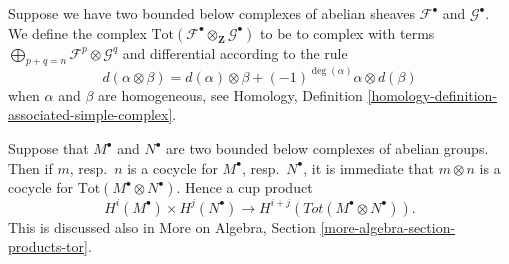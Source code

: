 \medskip\noindent
Suppose we have two bounded below complexes of abelian sheaves
${\mathcal F}^\bullet$ and ${\mathcal G}^\bullet$. We define the complex
$\text{Tot}({\mathcal F}^\bullet\otimes_{\mathbf Z} {\mathcal G}^\bullet)$
to be to complex with terms
$\bigoplus_{p + q = n} {\mathcal F}^p \otimes {\mathcal G}^q$
and differential according to the rule
\begin{equation}
\label{equation-differential-tensor-product-complexes}
d(\alpha \otimes \beta) =
d(\alpha)\otimes \beta + (-1)^{\deg(\alpha)} \alpha \otimes d(\beta)
\end{equation}
when $\alpha$ and $\beta$ are homogeneous, see
Homology, Definition \ref{homology-definition-associated-simple-complex}.

\medskip\noindent
Suppose that $M^\bullet$ and $N^\bullet$ are two bounded below
complexes of abelian groups. Then if $m$, resp.\ $n$
is a cocycle for $M^\bullet$, resp.\ $N^\bullet$, it is immediate
that $m \otimes n$ is a cocycle for $\text{Tot}(M^\bullet\otimes N^\bullet)$.
Hence a cup product
$$
H^i(M^\bullet) \times H^j(N^\bullet)
\longrightarrow
H^{i + j}(Tot(M^\bullet\otimes N^\bullet)).
$$
This is discussed also in
More on Algebra, Section \ref{more-algebra-section-products-tor}.

